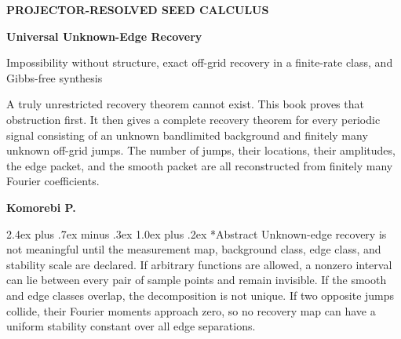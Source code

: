 \documentclass[11pt,oneside]{book}
\makeatletter
\renewcommand\chapter{\@startsection{chapter}{0}{\z@}%
  {2.4ex plus .7ex minus .3ex}%
  {1.0ex plus .2ex}%
  {\normalfont\LARGE\bfseries\color{Ink}}}
\theoremstyle{remark}
\makeatother
\begin{document}
\begin{titlepage}
\thispagestyle{empty}
\centering
{}
\vspace*{0.50in}
{\large\color{Blue}\bfseries PROJECTOR-RESOLVED SEED CALCULUS\par}
\vspace{0.16in}
{\fontsize{32}{37}\selectfont\bfseries Universal Unknown-Edge Recovery\par}
\vspace{0.14in}
{\fontsize{19}{23}\selectfont\color{Muted} Impossibility without structure, exact off-grid recovery in a finite-rate class, and Gibbs-free synthesis\par}
\vspace{0.40in}
\begin{minipage}{0.84\linewidth}
\large
A truly unrestricted recovery theorem cannot exist. This book proves that obstruction first. It then gives a complete recovery theorem for every periodic signal consisting of an unknown bandlimited background and finitely many unknown off-grid jumps. The number of jumps, their locations, their amplitudes, the edge packet, and the smooth packet are all reconstructed from finitely many Fourier coefficients.
\end{minipage}
\vfill
{\Large\bfseries Komorebi P.\par}
\vspace{0.28in}
\end{titlepage}

\frontmatter

\chapter*{Abstract}
Unknown-edge recovery is not meaningful until the measurement map, background class, edge class, and stability scale are declared. If arbitrary functions are allowed, a nonzero interval can lie between every pair of sample points and remain invisible. If the smooth and edge classes overlap, the decomposition is not unique. If two opposite jumps collide, their Fourier moments approach zero, so no recovery map can have a uniform stability constant over all edge separations.
\end{document}
